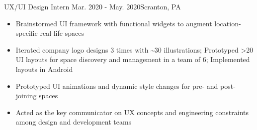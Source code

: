     {UX/UI Design Intern}
    {Mar. 2020 - May. 2020}{Scranton, PA}{}
\begin{itemize}

    \item Brainstormed UI framework with functional widgets to augment location-specific real-life spaces

    \item Iterated company logo designs 3 times with \textasciitilde30 illustrations; Prototyped >20 UI layouts
    for space discovery and management in a team of 6; Implemented layouts in Android

    \item Prototyped UI animations and dynamic style changes for pre- and post-joining spaces

    \item Acted as the key communicator on UX concepts and engineering constraints among design and development teams
\end{itemize}
\dividerSmall

